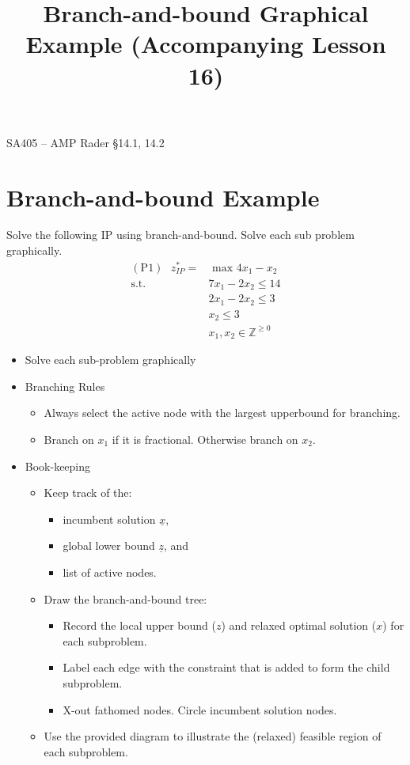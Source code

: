 \documentclass[11pt]{article}
\makeatletter
\theoremstyle{definition}
\renewcommand{\maketitle}{
  \noindent SA405 -- AMP \hfill Rader \S 14.1, 14.2  \\

  \begin{center}\Large{\textbf{\@title}}\end{center}
}
\makeatother
\begin{document}
  
\title{Branch-and-bound Graphical Example (Accompanying Lesson 16)}

\maketitle

\section{Branch-and-bound Example}

Solve the following IP using branch-and-bound. Solve each sub problem graphically.
    \begin{align*}
    (\mbox{P}1) ~~~ z_{IP}^* = & \text{ max } 4x_1 - x_2\\
      \text{s.t.} \quad & 7x_1 - 2x_2 \leq 14\\
                       & 2x_1 - 2x_2 \leq 3\\
                       & x_2 \leq 3\\
                       & x_1, x_2 \in \mathbb{Z}^{\geq 0}
    \end{align*}

\begin{itemize}
\item Solve each sub-problem graphically
\item Branching Rules
\begin{itemize}
\item Always select the active node with the largest upperbound for branching.
\item Branch on $x_1$ if it is fractional.  Otherwise branch on $x_2$.
\end{itemize}
\item Book-keeping
\begin{itemize}
\item Keep track of the:
\begin{itemize}
\item incumbent solution $\underline{x}$, 
\item global lower bound $\underline{z}$, and 
\item list of active nodes.
\end{itemize}
\item Draw the branch-and-bound tree:
\begin{itemize}
	\item Record the local upper bound ($z$) and relaxed optimal solution ($x$) for each subproblem.
	\item Label each edge with the constraint that is added to form the child subproblem.
	\item X-out fathomed nodes.  Circle incumbent solution nodes.
\end{itemize}
\item Use the provided diagram to illustrate the (relaxed) feasible region of each subproblem.
\end{itemize}
\end{itemize}
\end{document}
